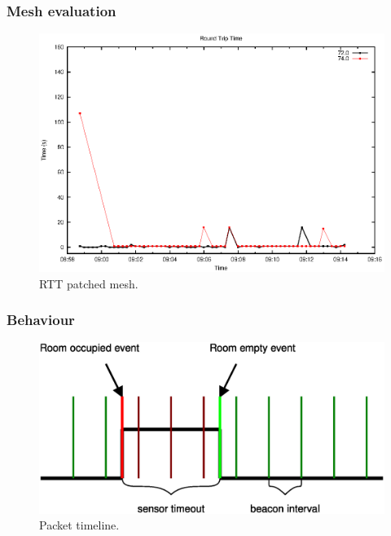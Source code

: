 \documentclass{beamer}
\begin{document}
\begin{frame}
\frametitle{Mesh evaluation}
	
	\begin{center}
		\begin{figure}
			\includegraphics[width=\textwidth]{plot_patched.eps}
			\caption{RTT patched mesh.}
		\end{figure}
	\end{center}
	
\end{frame}

\begin{frame}
\frametitle{Behaviour}

	\begin{center}
		\begin{figure}
			\includegraphics[width=\textwidth]{sensor.eps}
			\caption{Packet timeline.}
		\end{figure}
	\end{center}

\end{frame}
\end{document}
